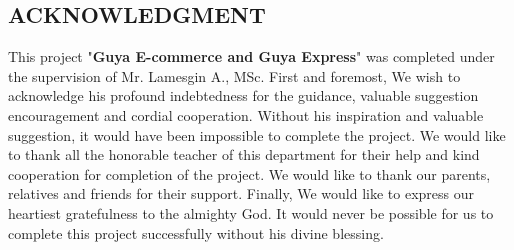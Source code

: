 \begin{normalsize}
\begin{center}
\section*{ACKNOWLEDGMENT}
\end{center}

\doublespacing

\vspace{1.0cm}
\noindent
This project "\textbf{Guya E-commerce and Guya Express}" was completed under the supervision of Mr. Lamesgin A., MSc. First and foremost, We wish to acknowledge his profound indebtedness for the guidance, valuable suggestion encouragement and cordial cooperation. Without his inspiration and valuable suggestion, it would have been impossible to complete the project. We would like to thank all the honorable teacher of this department for their help and kind cooperation for completion of the project. We would like to thank our parents, relatives and friends for their support. Finally, We would like to express our heartiest gratefulness to the almighty God. It would never be possible for us to complete this project successfully without his divine blessing.

\end{normalsize}

\clearpage